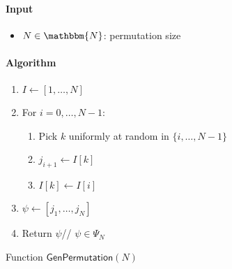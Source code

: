 \documentclass[a4paper]{article}
\newcommand{\N}{\mathbbm{N}}
\begin{document}
\begin{table}
  \begin{framed}
    \noindent\paragraph{Input}
    \begin{itemize}
    \item $N\in\N$: permutation size
    \end{itemize}
    \noindent\paragraph{Algorithm}
    \begin{enumerate}
    \item $I\leftarrow[1,\dots,N]$
    \item For $i=0,\dots,N-1$:
      \begin{enumerate}
      \item Pick $k$ uniformly at random in $\{i,\dots,N-1\}$
      \item $j_{i+1}\leftarrow I[k]$
      \item $I[k]\leftarrow I[i]$
      \end{enumerate}
    \item $\psi\leftarrow[j_1,\dots,j_N]$
    \item Return $\psi$\hfill// $\psi\in\Psi_N$
    \end{enumerate}
  \end{framed}
  \caption{Function $\mathsf{GenPermutation}(N)$}
  \label{gen-permutation}
\end{table}
\end{document}
